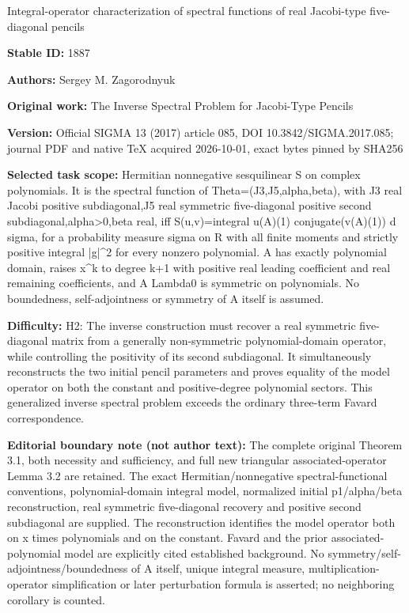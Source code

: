 \documentclass[11pt]{article}
\numberwithin{equation}{section}
\begin{document}
\begin{center}\Large Integral-operator characterization of spectral functions of real Jacobi-type five-diagonal pencils\end{center}
\noindent\textbf{Stable ID:} 1887\par
\noindent\textbf{Authors:} Sergey M. Zagorodnyuk\par
\noindent\textbf{Original work:} The Inverse Spectral Problem for Jacobi-Type Pencils\par
\noindent\textbf{Version:} Official SIGMA 13 (2017) article 085, DOI 10.3842/SIGMA.2017.085; journal PDF and native TeX acquired 2026-10-01, exact bytes pinned by SHA256\par
\noindent\textbf{Selected task scope:} Hermitian nonnegative sesquilinear S on complex polynomials. It is the spectral function of Theta=\allowbreak{}(J3,J5,alpha,beta), with J3 real Jacobi positive subdiagonal,J5 real symmetric five-diagonal positive second subdiagonal,alpha>0,beta real, iff S(u,v)=\allowbreak{}integral u(A)(1) conjugate(v(A)(1)) d sigma, for a probability measure sigma on R with all finite moments and strictly positive integral |g|\textasciicircum{}2 for every nonzero polynomial. A has exactly polynomial domain, raises x\textasciicircum{}k to degree k+\allowbreak{}1 with positive real leading coefficient and real remaining coefficients, and A Lambda0 is symmetric on polynomials. No boundedness, self-adjointness or symmetry of A itself is assumed.\par
\noindent\textbf{Difficulty:} H2: The inverse construction must recover a real symmetric five-diagonal matrix from a generally non-symmetric polynomial-domain operator, while controlling the positivity of its second subdiagonal. It simultaneously reconstructs the two initial pencil parameters and proves equality of the model operator on both the constant and positive-degree polynomial sectors. This generalized inverse spectral problem exceeds the ordinary three-term Favard correspondence.\par
\noindent\textbf{Editorial boundary note (not author text):} The complete original Theorem 3.1, both necessity and sufficiency, and full new triangular associated-operator Lemma 3.2 are retained. The exact Hermitian/nonnegative spectral-functional conventions, polynomial-domain integral model, normalized initial p1/alpha/beta reconstruction, real symmetric five-diagonal recovery and positive second subdiagonal are supplied. The reconstruction identifies the model operator both on x times polynomials and on the constant. Favard and the prior associated-polynomial model are explicitly cited established background. No symmetry/self-adjointness/boundedness of A itself, unique integral measure, multiplication-operator simplification or later perturbation formula is asserted; no neighboring corollary is counted.\par
\end{document}
